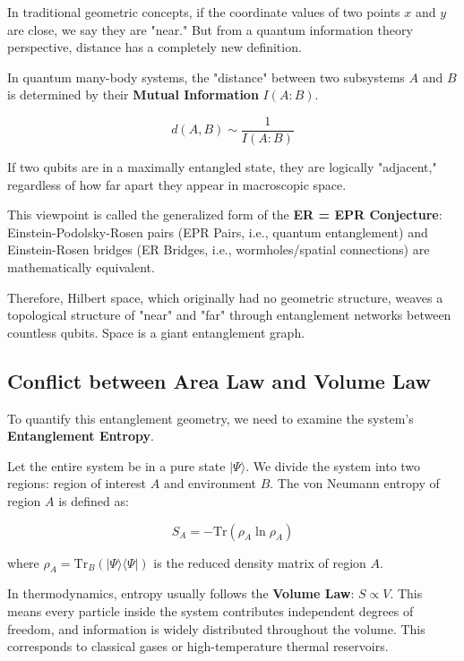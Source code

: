 In traditional geometric concepts, if the coordinate values of two points $x$ and $y$ are close, we say they are "near." But from a quantum information theory perspective, distance has a completely new definition.

\begin{definition}
In quantum many-body systems, the "distance" between two subsystems $A$ and $B$ is determined by their \textbf{Mutual Information} $I(A:B)$.

\begin{equation}
d(A, B) \sim \frac{1}{I(A:B)}
\end{equation}

If two qubits are in a maximally entangled state, they are logically "adjacent," regardless of how far apart they appear in macroscopic space.
\end{definition}

This viewpoint is called the generalized form of the \textbf{ER = EPR Conjecture}: Einstein-Podolsky-Rosen pairs (EPR Pairs, i.e., quantum entanglement) and Einstein-Rosen bridges (ER Bridges, i.e., wormholes/spatial connections) are mathematically equivalent.

Therefore, Hilbert space, which originally had no geometric structure, weaves a topological structure of "near" and "far" through entanglement networks between countless qubits. Space is a giant entanglement graph.

\subsection{Conflict between Area Law and Volume Law}

To quantify this entanglement geometry, we need to examine the system's \textbf{Entanglement Entropy}.

Let the entire system be in a pure state $|\Psi\rangle$. We divide the system into two regions: region of interest $A$ and environment $B$. The von Neumann entropy of region $A$ is defined as:

\begin{equation}
S_A = -\text{Tr}(\rho_A \ln \rho_A)
\end{equation}

where $\rho_A = \text{Tr}_B(|\Psi\rangle\langle\Psi|)$ is the reduced density matrix of region $A$.

In thermodynamics, entropy usually follows the \textbf{Volume Law}: $S \propto V$. This means every particle inside the system contributes independent degrees of freedom, and information is widely distributed throughout the volume. This corresponds to classical gases or high-temperature thermal reservoirs.

